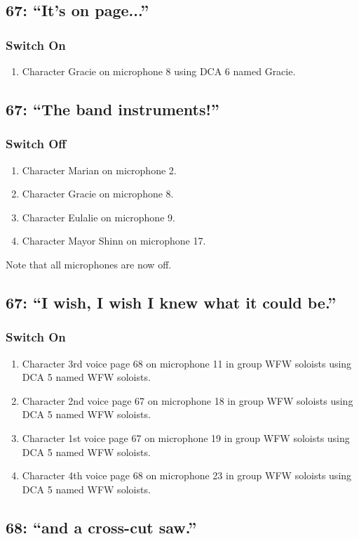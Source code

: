 \subsection* {67: ``It's on page...''}
\subsubsection* {Switch On}
\begin{enumerate}
\item Character Gracie on microphone 8 using DCA 6 named Gracie.
\end{enumerate}
\subsection* {67: ``The band instruments!''}
\subsubsection* {Switch Off}
\begin{enumerate}
\item Character Marian on microphone 2.
\item Character Gracie on microphone 8.
\item Character Eulalie on microphone 9.
\item Character Mayor Shinn on microphone 17.
\end{enumerate}
Note that all microphones are now off.
\subsection* {67: ``I wish, I wish I knew what it could be.''}
\subsubsection* {Switch On}
\begin{enumerate}
\item Character 3rd voice page 68 on microphone 11 in group WFW soloists using DCA 5 named WFW soloists.
\item Character 2nd voice page 67 on microphone 18 in group WFW soloists using DCA 5 named WFW soloists.
\item Character 1st voice page 67 on microphone 19 in group WFW soloists using DCA 5 named WFW soloists.
\item Character 4th voice page 68 on microphone 23 in group WFW soloists using DCA 5 named WFW soloists.
\end{enumerate}
\subsection* {68: ``and a cross-cut saw.''}
